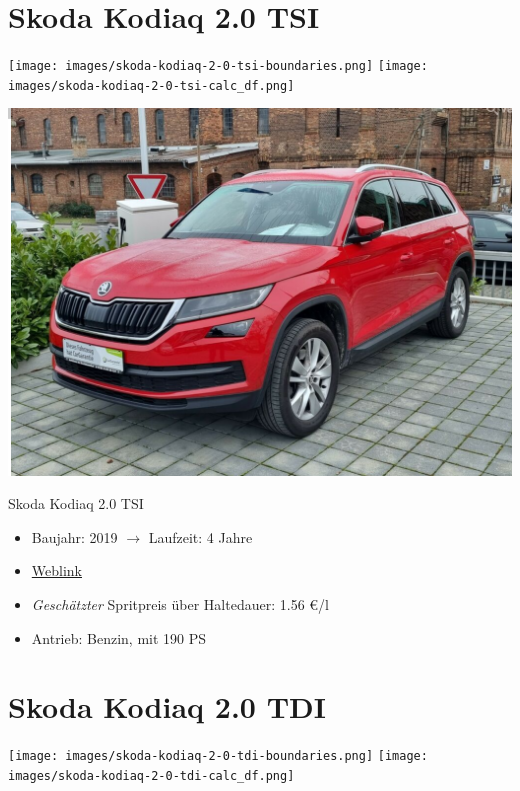 \documentclass[landscape, DIV=99, 14pt]{scrartcl}
\begin{document}
\pagebreak


\twocolumn

\section*{Skoda Kodiaq 2.0 TSI}
\begin{center}
\texttt{[image: images/skoda-kodiaq-2-0-tsi-boundaries.png]}
\null
\vspace{0.5cm}
\texttt{[image: images/skoda-kodiaq-2-0-tsi-calc\_df.png]}
\end{center}

\pagebreak
\null
\vspace{2cm}
\begin{center}
\includegraphics[width=0.9\columnwidth]{cars/skoda-kodiaq-2p0-tsi.png}

Skoda Kodiaq 2.0 TSI
\end{center}

\begin{itemize}
    \item Baujahr: 2019 $\rightarrow$ Laufzeit: 4 Jahre
    \item \href{https://suchen.mobile.de/fahrzeuge/details.html?id=336695573}{Weblink}
    \item \emph{Gesch\"atzter} Spritpreis \"uber Haltedauer: 1.56 \euro{}/l
    \item Antrieb: Benzin, mit 190 PS
\end{itemize}

\pagebreak


\twocolumn

\section*{Skoda Kodiaq 2.0 TDI}
\begin{center}
\texttt{[image: images/skoda-kodiaq-2-0-tdi-boundaries.png]}
\null
\vspace{0.5cm}
\texttt{[image: images/skoda-kodiaq-2-0-tdi-calc\_df.png]}
\end{center}
\end{document}

